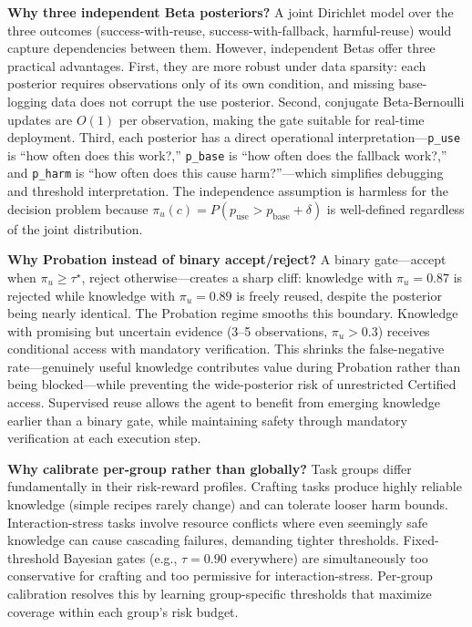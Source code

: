 \documentclass[letterpaper]{article}
\begin{document}
\textbf{Why three independent Beta posteriors?} A joint Dirichlet model over the three outcomes (success-with-reuse, success-with-fallback, harmful-reuse) would capture dependencies between them. However, independent Betas offer three practical advantages. First, they are more robust under data sparsity: each posterior requires observations only of its own condition, and missing base-logging data does not corrupt the use posterior. Second, conjugate Beta-Bernoulli updates are $O(1)$ per observation, making the gate suitable for real-time deployment. Third, each posterior has a direct operational interpretation---\texttt{p\_use} is ``how often does this work?,'' \texttt{p\_base} is ``how often does the fallback work?,'' and \texttt{p\_harm} is ``how often does this cause harm?''---which simplifies debugging and threshold interpretation. The independence assumption is harmless for the decision problem because $\pi_u(c) = P(p_{\text{use}} > p_{\text{base}} + \delta)$ is well-defined regardless of the joint distribution.

\textbf{Why Probation instead of binary accept/reject?} A binary gate---accept when $\pi_u \ge \tau^\star$, reject otherwise---creates a sharp cliff: knowledge with $\pi_u = 0.87$ is rejected while knowledge with $\pi_u = 0.89$ is freely reused, despite the posterior being nearly identical. The Probation regime smooths this boundary. Knowledge with promising but uncertain evidence (3--5 observations, $\pi_u > 0.3$) receives conditional access with mandatory verification. This shrinks the false-negative rate---genuinely useful knowledge contributes value during Probation rather than being blocked---while preventing the wide-posterior risk of unrestricted Certified access. Supervised reuse allows the agent to benefit from emerging knowledge earlier than a binary gate, while maintaining safety through mandatory verification at each execution step.

\textbf{Why calibrate per-group rather than globally?} Task groups differ fundamentally in their risk-reward profiles. Crafting tasks produce highly reliable knowledge (simple recipes rarely change) and can tolerate looser harm bounds. Interaction-stress tasks involve resource conflicts where even seemingly safe knowledge can cause cascading failures, demanding tighter thresholds. Fixed-threshold Bayesian gates (e.g., $\tau{=}0.90$ everywhere) are simultaneously too conservative for crafting and too permissive for interaction-stress. Per-group calibration resolves this by learning group-specific thresholds that maximize coverage within each group's risk budget.
\end{document}
